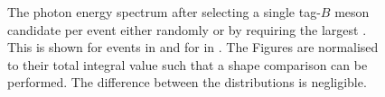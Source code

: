 \begin{figure}[htbp!]
    \centering
    \caption{\label{fig:same_mode_best_tag_selection}
    The photon energy spectrum after selecting a single tag-$B$ meson candidate per event either randomly or by requiring the largest \feiProb.
    This is shown for \BptoXsgamma events in  
    and for \BztoXsgamma in .
    The Figures are normalised to their total integral value such that a shape comparison can be performed.
    The difference between the distributions is negligible.
    }
\end{figure}

